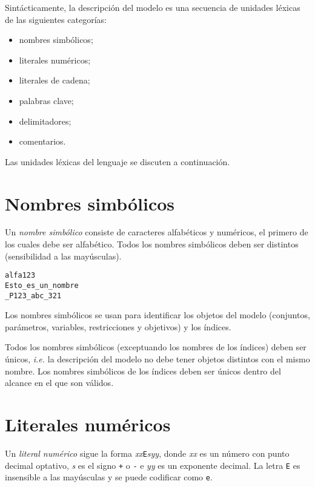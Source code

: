 \documentclass[11pt,spanish]{report}
\def\para#1{\noindent{\bf#1}}
\begin{document}
Sintácticamente, la descripción del modelo es una secuencia de unidades léxicas de las siguientes categorías:

\begin{itemize}
\item nombres simbólicos;
\item literales numéricos;
\item literales de cadena;
\item palabras clave;
\item delimitadores;
\item comentarios.
\end{itemize}

Las unidades léxicas del lenguaje se discuten a continuación.

\section{Nombres simbólicos}

Un {\it nombre simbólico} consiste de caracteres alfabéticos y numéricos, el primero de los cuales debe ser alfabético. Todos los nombres simbólicos deben ser distintos (sensibilidad a las mayúsculas).

\para{Ejemplos}

\begin{verbatim}
alfa123
Esto_es_un_nombre
_P123_abc_321
\end{verbatim}

Los nombres simbólicos se usan para identificar los objetos del modelo (conjuntos, parámetros, variables, restricciones y objetivos) y los índices.

Todos los nombres simbólicos (exceptuando los nombres de los índices) deben ser únicos, {\it i.e.} la descripción del modelo no debe tener objetos distintos con el mismo nombre. Los nombres simbólicos de los índices deben ser únicos dentro del alcance en el que son válidos.

\section{Literales numéricos}

Un {\it literal numérico} sigue la forma {\it xx}{\tt E}{\it syy}, donde {\it xx} es un número con punto decimal optativo, {\it s} es el signo {\tt+} o {\tt-} e {\it yy} es un exponente decimal. La letra {\tt E} es insensible a las mayúsculas y se puede codificar como {\tt e}.

\para{Ejemplos}
\end{document}
